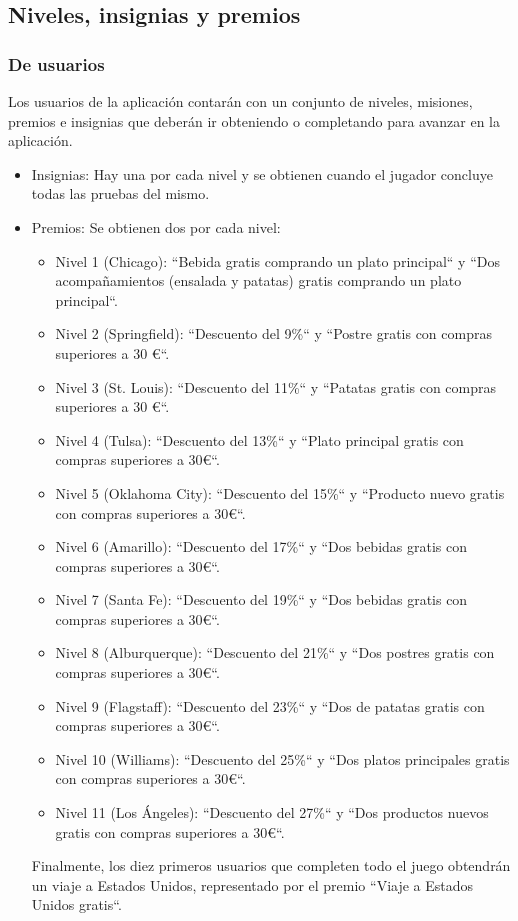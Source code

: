 \documentclass[twoside]{report}
\begin{document}
\subsection{Niveles, insignias y premios}

\subsubsection{De usuarios}

Los usuarios de la aplicación contarán con un conjunto de niveles, misiones, premios e insignias que deberán ir obteniendo o completando para avanzar en la aplicación. 

\begin{itemize}
\item Insignias: Hay una por cada nivel y se obtienen cuando el jugador concluye todas las pruebas del mismo.
\item Premios: Se obtienen dos por cada nivel:
	\begin{itemize}
	\item Nivel 1 (Chicago): “Bebida gratis comprando un plato principal“ y “Dos acompañamientos (ensalada y patatas) gratis comprando un plato principal“.
	\item Nivel 2 (Springfield): “Descuento del 9\%“ y “Postre gratis con compras superiores a 30 \euro“.
	\item Nivel 3 (St. Louis): “Descuento del 11\%“ y “Patatas gratis con compras superiores a 30 \euro“.
	\item Nivel 4 (Tulsa): “Descuento del 13\%“ y “Plato principal gratis con compras superiores a 30\euro“.
	\item Nivel 5 (Oklahoma City): “Descuento del 15\%“ y “Producto nuevo gratis con compras superiores a 30\euro“.
	\item Nivel 6 (Amarillo): “Descuento del 17\%“ y “Dos bebidas gratis con compras superiores a 30\euro“.
	\item Nivel 7 (Santa Fe): “Descuento del 19\%“ y “Dos bebidas gratis con compras superiores a 30\euro“.
	\item Nivel 8 (Alburquerque): “Descuento del 21\%“ y “Dos postres gratis con compras superiores a 30\euro“.
	\item Nivel 9 (Flagstaff): “Descuento del 23\%“ y “Dos de patatas gratis con compras superiores a 30\euro“.
	\item Nivel 10 (Williams): “Descuento del 25\%“ y “Dos platos principales gratis con compras superiores a 30\euro“.
	\item Nivel 11 (Los Ángeles): “Descuento del 27\%“ y “Dos productos nuevos gratis con compras superiores a 30\euro“.
	\end{itemize}
	Finalmente, los diez primeros usuarios que completen todo el juego obtendrán un viaje a Estados Unidos, representado por el premio “Viaje a Estados Unidos gratis“.
\end{itemize}
\end{document}
